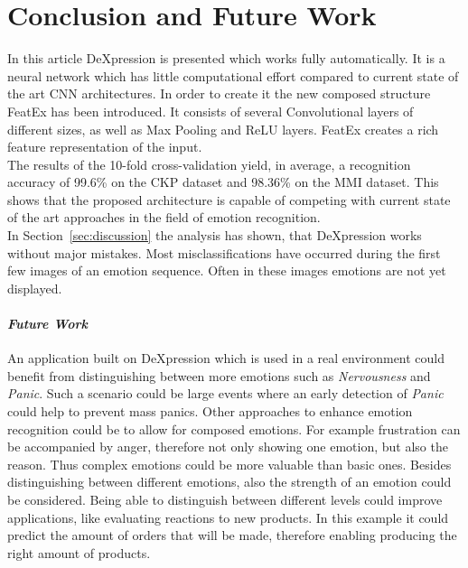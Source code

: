 \section{Conclusion and Future Work}
\label{sec:conclusion}

In this article DeXpression is presented which works fully automatically. It is a neural network which has little computational effort compared to current state of the art CNN architectures. In order to create it the new composed structure FeatEx has been introduced. It consists of several Convolutional layers of different sizes, as well as Max Pooling and ReLU layers. FeatEx creates a rich feature representation of the input. \\
The results of the 10-fold cross-validation yield, in average, a recognition accuracy of 99.6\% on the CKP dataset and 98.36\% on the MMI dataset. This shows that the proposed architecture is capable of competing with current state of the art approaches in the field of emotion recognition.\\
In Section~\ref{sec:discussion} the analysis has shown, that DeXpression works without major mistakes. Most misclassifications have occurred during the first few images of an emotion sequence. Often in these images emotions are not yet displayed.

\paraV
\paragraph{\textit{Future Work}}

An application built on DeXpression which is used in a real environment could benefit from distinguishing between more emotions such as \textit{Nervousness} and \textit{Panic}. Such a scenario could be large events where an early detection of \textit{Panic} could help to prevent mass panics. Other approaches to enhance emotion recognition could be to allow for composed emotions. For example frustration can be accompanied by anger, therefore not only showing one emotion, but also the reason. Thus complex emotions could be more valuable than basic ones. Besides distinguishing between different emotions, also the strength of an emotion could be considered. Being able to distinguish between different levels could improve applications, like evaluating reactions to new products. In this example it could predict the amount of orders that will be made, therefore enabling producing the right amount of products.